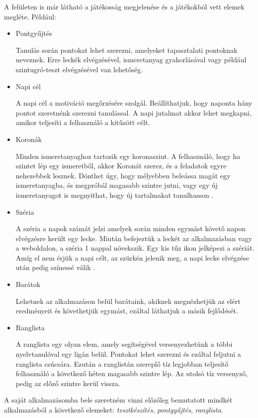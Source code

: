 A felületen is már látható a játékosság megjelenése és a játékokból vett elemek megléte. Például:
\begin{itemize}
  \item {Pontgyűjtés}
        \begin{addmargin}[\parindent]{0pt}
          Tanulás során pontokat lehet szerezni, amelyeket tapasztalati pontoknak neveznek. Erre leckék elvégzésével, ismeretanyag gyakorlásával vagy például szintugró-teszt elvégzésével van lehetőség.
        \end{addmargin}
  \item Napi cél
        \begin{addmargin}[\parindent]{0pt}
          A napi cél a motiváció megőrzésére szolgál. Beállíthatjuk, hogy naponta hány pontot szeretnénk szerezni tanulással. A napi jutalmat akkor lehet megkapni, amikor teljesíti a felhasználó a kitűzött célt.
        \end{addmargin}
  \item Koronák
        \begin{addmargin}[\parindent]{0pt}
          Minden ismeretanyaghoz tartozik egy koronaszint. A felhasználó, hogy ha szintet lép egy ismeretből, akkor Koronát szerez, és a feladatok egyre nehezebbek lesznek. Dönthet úgy, hogy mélyebben beleássa magát egy ismeretanyagba, és megpróbál magasabb szintre jutni, vagy egy új ismeretanyagot is megnyithat, hogy új tartalmakat tanulhasson \cite{koronaszintekDuolingo}.
        \end{addmargin}
  \item Széria
        \begin{addmargin}[\parindent]{0pt}
          A széria a napok számát jelzi amelyek során minden egymást követő napon elvégzésre került egy lecke. Miután befejeztük a leckét az alkalmazásban vagy a weboldalon, a széria 1 nappal növekszik. Egy kis tűz ikon jelképezi a szériát. Amíg el nem érjük a napi célt, az szürkén jelenik meg, a napi lecke elvégzése után pedig színessé válik \cite{szeriaDuolingo}.
        \end{addmargin}
  \item Barátok
        \begin{addmargin}[\parindent]{0pt}
          Lehetnek az alkalmazáson belül barátaink, akiknek megnézhetjük az elért eredményeit és követhetjük egymást, ezáltal láthatjuk a másik fejlődését.
        \end{addmargin}
  \item Ranglista
        \begin{addmargin}[\parindent]{0pt}
          A ranglista egy olyan elem, amely segítségével versenyezhetünk a többi nyelvtanulóval egy ligán belül. Pontokat lehet szerezni és ezáltal feljutni a ranglista csúcsára. Ezután a ranglistán szereplő tíz legjobban teljesítő felhasználó a következő héten magasabb szintre lép. Az utolsó tíz versenyző, pedig az előző szintre kerül vissza.
        \end{addmargin}
\end{itemize}


A saját alkalmazásomba bele szeretném vinni előzőleg bemutatott mindkét alkalmazásból a következő elemeket: \textit{tesztkészítés}, \textit{pontgyűjtés}, \textit{ranglista}.
